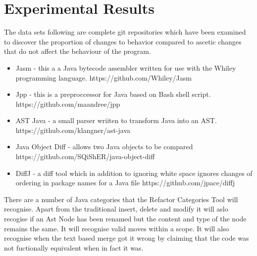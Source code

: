 
\chapter{Experimental Results}

The data sets following are complete git repositories which have been examined to discover the proportion of changes to behavior compared to ascetic changes that do not affect the behaviour of the program. 

% 
% 

\begin{itemize}
  \item Jasm - this a a Java bytecode assembler written for use with the Whiley programming language. https://github.com/Whiley/Jasm
  \item Jpp - this is a preproccessor for Java based on Bash shell script. https://github.com/maandree/jpp
  \item AST Java - a small parser wriiten to transform Java into an AST. https://github.com/klangner/ast-java
  \item Java Object Diff - allows two Java objects to be compared https://github.com/SQiShER/java-object-diff
  \item DiffJ - a diff tool which in addition to ignoring white space ignores changes of ordering in package names for a Java file https://github.com/jpace/diffj
\end{itemize}


There are a number of Java categories that the Refactor Categories Tool will recognise.  Apart from the traditional insert, delete and modify it will aslo recogise if an Ast Node has been renamed but the content and type of the node remains the same.  It will recognise valid moves within a scope. It will also recognise when the text based merge got it wrong by claiming that the code was not fuctionally equivalent when in fact it was.

